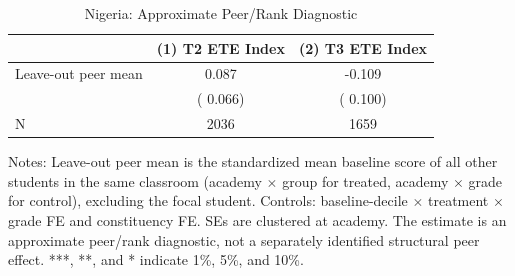 \begin{table}[!htbp]
\centering
\caption{Nigeria: Approximate Peer/Rank Diagnostic}
\label{tab:ng_peer_effects}
\begin{threeparttable}
\begin{tabular}[t]{lcc}
\toprule
 & (1) T2 ETE Index & (2) T3 ETE Index \\
\midrule
Leave-out peer mean &   0.087 &  -0.109 \\
 & (  0.066) & (  0.100) \\
\addlinespace
N & 2036 & 1659 \\
\bottomrule
\end{tabular}
\begin{tablenotes}[para]
\item Notes: Leave-out peer mean is the standardized mean baseline score of all other students in the same classroom (academy $\times$ group for treated, academy $\times$ grade for control), excluding the focal student. Controls: baseline-decile $\times$ treatment $\times$ grade FE and constituency FE. SEs are clustered at academy. The estimate is an approximate peer/rank diagnostic, not a separately identified structural peer effect. ***, **, and * indicate 1\%, 5\%, and 10\%.
\end{tablenotes}
\end{threeparttable}
\end{table}
